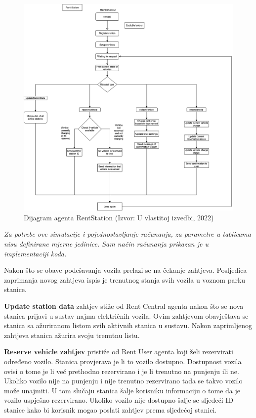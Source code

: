 \documentclass{foi}
\begin{document}
\pagebreak

\begin{figure}[h!]
	\centering
	\includegraphics[width=1.0\textwidth]{slike/rentStationSheme.png}
	\caption{Dijagram agenta RentStation (Izvor: U vlastitoj izvedbi, 2022)}
\end{figure}

 \textit{Za potrebe ove simulacije i pojednostavljanje računanja, za parametre u tablicama nisu definirane mjerne jedinice. Sam način računanja prikazan je u implementaciji koda.}

Nakon što se obave podešavanja vozila prelazi se na čekanje zahtjeva. Posljedica zaprimanja novog zahtjeva ispis je trenutnog stanja svih vozila u voznom parku stanice.

\textbf{Update station data} zahtjev stiže od Rent Central agenta nakon što se nova stanica prijavi u sustav najma električnih vozila. Ovim zahtjevom obavještava se stanica sa ažuriranom listom svih aktivnih stanica u sustavu. Nakon zaprimljenog zahtjeva stanica ažurira svoju trenutnu listu.

\textbf{Reserve vehicle zahtjev} pristiže od Rent User agenta koji želi rezervirati određeno vozilo. Stanica provjerava je li to vozilo dostupno. Dostupnost vozila ovisi o tome je li već prethodno rezervirano i je li trenutno na punjenju ili ne. Ukoliko vozilo nije na punjenju i nije trenutno rezervirano tada se takvo vozilo može unajmiti. U tom slučaju stanica šalje korisniku informaciju o tome da je vozilo uspješno rezervirano. Ukoliko vozilo nije dostupno šalje se sljedeći ID stanice kako bi korisnik mogao poslati zahtjev prema sljedećoj stanici.
\end{document}
